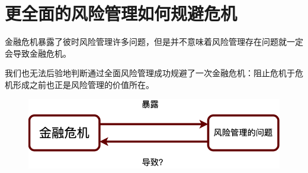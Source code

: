 \section{更全面的风险管理如何规避危机}
\begin{frame}
    金融危机暴露了彼时风险管理许多问题，但是并不意味着风险管理存在问题就一定会导致金融危机。

    我们也无法后验地判断通过全面风险管理成功规避了一次金融危机：阻止危机于危机形成之前也正是风险管理的价值所在。
    \begin{figure}
        \centering
        \includegraphics[width=0.8\linewidth]{img/luna.drawio.png}
    \end{figure}
\end{frame}


